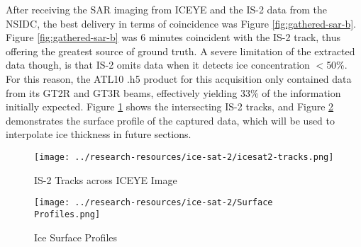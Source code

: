 After receiving the SAR imaging from ICEYE and the IS-2 data from the NSIDC, the best delivery in terms of coincidence was Figure \ref{fig:gathered-sar-b}. Figure \ref{fig:gathered-sar-b} was 6 minutes coincident with the IS-2 track, thus offering the greatest source of ground truth. A severe limitation of the extracted data though, is that IS-2 omits data when it detects ice concentration $<$50\%. For this reason, the ATL10 .h5 product for this acquisition only contained data from its GT2R and GT3R beams, effectively yielding 33\% of the information initially expected. Figure \ref{fig:icesat2-tracks} shows the intersecting IS-2 tracks, and Figure \ref{fig:ice-thickness-gathered} demonstrates the surface profile of the captured data, which will be used to interpolate ice thickness in future sections.


\begin{figure}[h!]
	\centering
	\texttt{[image: ../research-resources/ice-sat-2/icesat2-tracks.png]}
	\caption[Overlayed LiDAR and SAR Readings]{IS-2 Tracks across ICEYE Image}
	\label{fig:icesat2-tracks}
\end{figure}

\begin{figure}[h!]
	\centering
	\texttt{[image: ../research-resources/ice-sat-2/Surface Profiles.png]}
	\caption[Ice Surface Profile of Acquired Data]{Ice Surface Profiles}
	\label{fig:ice-thickness-gathered}
\end{figure}

